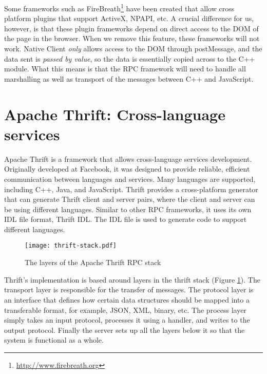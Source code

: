 Some frameworks such as FireBreath\footnote{\url{http://www.firebreath.org}} have been created that allow cross platform plugins that support ActiveX, NPAPI, etc. A crucial difference for us, however, is that these plugin frameworks depend on direct access to the DOM of the page in the browser. When we remove this feature, these frameworks will not work. Native Client \emph{only} allows access to the DOM through postMessage, and the data sent is \emph{passed by value}, so the data is essentially copied across to the C++ module. What this means is that the RPC framework will need to handle all marshalling as well as transport of the messages between C++ and JavaScript.




\section{Apache Thrift: Cross-language services} %
\label{sec:apache_thrift_cross_language_services}
Apache Thrift is a framework that allows cross-language services development. Originally developed at Facebook, it was designed to provide reliable, efficient communication between languages and services. Many languages are supported, including C++, Java, and JavaScript. Thrift provides a cross-platform generator that can generate Thrift client and server pairs, where the client and server can be using different languages. Similar to other RPC frameworks, it uses its own IDL file format, Thrift IDL. The IDL file is used to generate code to support different languages.

\begin{figure}
    \centering
    \texttt{[image: thrift-stack.pdf]} 
    \caption{The layers of the Apache Thrift RPC stack}
    \label{fig:thrift-stack}
\end{figure}

Thrift's implementation is based around layers in the thrift stack (Figure \ref{fig:thrift-stack}). The transport layer is responsible for the transfer of messages. The protocol layer is an interface that defines how certain data structures should be mapped into a transferable format, for example, JSON, XML, binary, etc. The process layer simply takes an input protocol, processes it using a handler, and writes to the output protocol. Finally the server sets up all the layers below it so that the system is functional as a whole.

